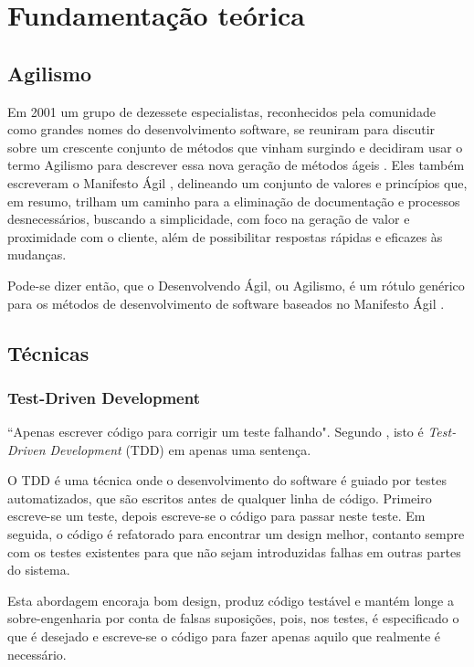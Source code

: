 \chapter{Fundamentação teórica}

\section{Agilismo}

Em 2001 um grupo de dezessete especialistas, reconhecidos pela comunidade como
grandes nomes do desenvolvimento software, se reuniram para discutir sobre um
crescente conjunto de métodos que vinham surgindo e decidiram usar o termo
Agilismo para descrever essa nova geração de métodos ágeis \cite{AgileStory}.
Eles também escreveram o Manifesto Ágil \cite{AgileManifesto}, delineando um
conjunto de valores e princípios que, em resumo, trilham um
caminho para a eliminação de documentação e processos desnecessários, buscando
a simplicidade, com foco na geração de valor e proximidade com o cliente, além
de possibilitar respostas rápidas e eficazes às mudanças.

Pode-se dizer então, que o Desenvolvendo Ágil, ou Agilismo, é um rótulo genérico
para os métodos de desenvolvimento de software baseados no Manifesto Ágil
\cite{BDDRodrigo}.


\section{Técnicas}

\subsection{Test-Driven Development}
``Apenas escrever código para corrigir um teste falhando". Segundo
, isto é \textit{Test-Driven Development} (TDD)
\cite{TDDbyExample} em apenas uma sentença.

O TDD é uma técnica onde o desenvolvimento do software é guiado por testes
automatizados, que são escritos antes de qualquer linha de código. Primeiro
escreve-se um teste, depois escreve-se o código para passar neste teste. Em
seguida, o código é refatorado para encontrar um design melhor, contanto sempre
com os testes existentes para que não sejam introduzidas falhas em outras partes
do sistema.

Esta abordagem encoraja bom design, produz código testável e mantém longe a
sobre-engenharia por conta de falsas suposições, pois, nos testes, é
especificado o que é desejado e escreve-se o código para fazer apenas aquilo que
realmente é necessário. \cite{TestDrivenKoskela, TDDbyExample, EmpiricalTDD}

